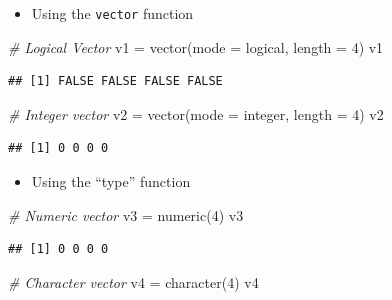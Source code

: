 \documentclass[
]{book}
\newenvironment{Shaded}{\begin{snugshade}}{\end{snugshade}}
\newcommand{\AttributeTok}[1]{\textcolor[rgb]{0.77,0.63,0.00}{#1}}
\newcommand{\CommentTok}[1]{\textcolor[rgb]{0.56,0.35,0.01}{\textit{#1}}}
\newcommand{\DecValTok}[1]{\textcolor[rgb]{0.00,0.00,0.81}{#1}}
\newcommand{\FunctionTok}[1]{\textcolor[rgb]{0.00,0.00,0.00}{#1}}
\newcommand{\NormalTok}[1]{#1}
\newcommand{\OtherTok}[1]{\textcolor[rgb]{0.56,0.35,0.01}{#1}}
\newcommand{\StringTok}[1]{\textcolor[rgb]{0.31,0.60,0.02}{#1}}
\providecommand{\tightlist}{%
  \setlength{\itemsep}{0pt}\setlength{\parskip}{0pt}}
\begin{document}
\begin{itemize}
\tightlist
\item
  Using the \texttt{vector} function
\end{itemize}

\begin{Shaded}
\begin{Highlighting}[]
\CommentTok{\# Logical Vector}
\NormalTok{v1 }\OtherTok{=} \FunctionTok{vector}\NormalTok{(}\AttributeTok{mode =} \StringTok{\textquotesingle{}logical\textquotesingle{}}\NormalTok{, }\AttributeTok{length =} \DecValTok{4}\NormalTok{)}
\NormalTok{v1}
\end{Highlighting}
\end{Shaded}

\begin{verbatim}
## [1] FALSE FALSE FALSE FALSE
\end{verbatim}

\begin{Shaded}
\begin{Highlighting}[]
\CommentTok{\# Integer vector}
\NormalTok{v2 }\OtherTok{=} \FunctionTok{vector}\NormalTok{(}\AttributeTok{mode =} \StringTok{\textquotesingle{}integer\textquotesingle{}}\NormalTok{, }\AttributeTok{length =} \DecValTok{4}\NormalTok{)}
\NormalTok{v2}
\end{Highlighting}
\end{Shaded}

\begin{verbatim}
## [1] 0 0 0 0
\end{verbatim}

\begin{itemize}
\tightlist
\item
  Using the ``type'' function
\end{itemize}

\begin{Shaded}
\begin{Highlighting}[]
\CommentTok{\# Numeric vector}
\NormalTok{v3 }\OtherTok{=} \FunctionTok{numeric}\NormalTok{(}\DecValTok{4}\NormalTok{)}
\NormalTok{v3}
\end{Highlighting}
\end{Shaded}

\begin{verbatim}
## [1] 0 0 0 0
\end{verbatim}

\begin{Shaded}
\begin{Highlighting}[]
\CommentTok{\# Character vector}
\NormalTok{v4 }\OtherTok{=} \FunctionTok{character}\NormalTok{(}\DecValTok{4}\NormalTok{)}
\NormalTok{v4}
\end{Highlighting}
\end{Shaded}
\end{document}
